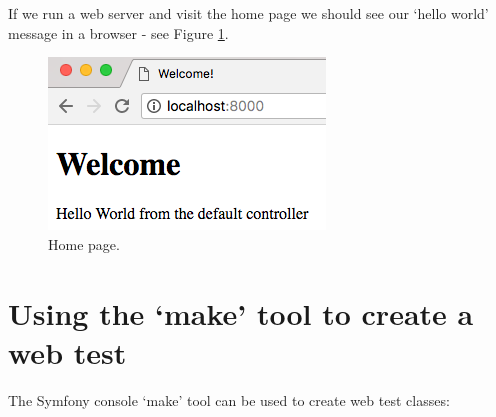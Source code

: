 \documentclass[a4paperpaper,openright]{book}
\begin{document}
If we run a web server and visit the home page we should see our `hello
world' message in a browser - see Figure \ref{homepage}.

\begin{figure}
\centering
\includegraphics{./tex2pdf.-5a4428120ede4be1/a97f353efafa2faa98064075e63812a2b1cec288.png}
\caption{Home page. \label{homepage}}
\end{figure}

\hypertarget{using-the-make-tool-to-create-a-web-test}{%
\section{Using the `make' tool to create a web
test}\label{using-the-make-tool-to-create-a-web-test}}

The Symfony console `make' tool can be used to create web test classes:
\end{document}
